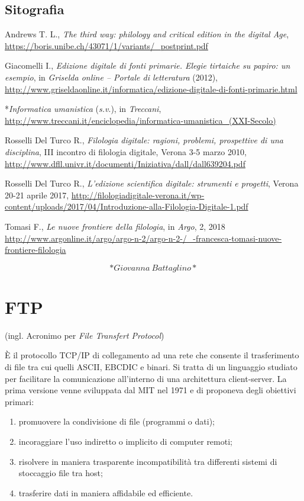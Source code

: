 \documentclass[
  b5paper,
  twoside,
  12pt,
  chapterprefix=false,
  bibliography=totocnumbered,
  parskip=false]{scrbook}
\begin{document}
\hypertarget{sitografia-12}{%
\section*{Sitografia}\label{sitografia-12}}

Andrews T. L., \emph{The third way: philology and critical edition in the
digital Age},
\url{https://boris.unibe.ch/43071/1/variants/_postprint.pdf}~

Giacomelli I., \emph{Edizione digitale di fonti primarie. Elegie tirtaiche su
papiro: un esempio}, in \emph{Griselda online -- Portale di letteratura}
(2012),
\url{http://www.griseldaonline.it/informatica/edizione-digitale-di-fonti-primarie.html}

*\emph{Informatica umanistica} (\emph{s.v}.), in \emph{Treccani},
\url{http://www.treccani.it/enciclopedia/informatica-umanistica_(XXI-Secolo)}

Rosselli Del Turco R., \emph{Filologia digitale: ragioni, problemi,
prospettive di una disciplina}, III incontro di filologia digitale,
Verona 3-5 marzo 2010,
\url{http://www.dfll.univr.it/documenti/Iniziativa/dall/dall639204.pdf}

Rosselli Del Turco R., \emph{L'edizione scientifica digitale: strumenti e
progetti}, Verona 20-21 aprile 2017,
\url{http://filologiadigitale-verona.it/wp-content/uploads/2017/04/Introduzione-alla-Filologia-Digitale-1.pdf}

Tomasi F., \emph{Le nuove frontiere della filologia}, in \emph{Argo}, 2, 2018
\url{http://www.argonline.it/argo/argo-n-2/argo-n-2-/_-francesca-tomasi-nuove-frontiere-filologia}

\[*Giovanna~Battaglino*\]

\hypertarget{ftp}{%
\chapter{FTP}\label{ftp}}

(ingl. Acronimo per \emph{File Transfert Protocol})

È il protocollo TCP/IP di collegamento ad una rete che consente il
trasferimento di file tra cui quelli ASCII, EBCDIC e binari. Si tratta
di un linguaggio studiato per facilitare la comunicazione all'interno di
una architettura client-server. La prima versione venne sviluppata dal
MIT nel 1971 e di proponeva degli obiettivi primari:

\begin{enumerate}
\def\labelenumi{\arabic{enumi}.}
\item
  promuovere la condivisione di file (programmi o dati);
\item
  incoraggiare l'uso indiretto o implicito di computer remoti;
\item
  risolvere in maniera trasparente incompatibilità tra differenti
  sistemi di stoccaggio file tra host;
\item
  trasferire dati in maniera affidabile ed efficiente.
\end{enumerate}
\end{document}
